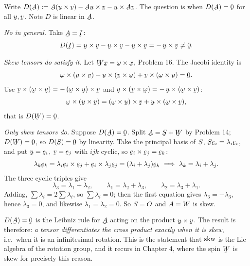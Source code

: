 \begin{problem}[Is $\bA(\bu\times\bv)=\bA\bu\times\bv+\bu\times\bA\bv$?]
\end{problem}
\begin{solution}
Write $D(\bA):=\bA(\bu\times\bv)-\bA\bu\times\bv-\bu\times\bA\bv$. The
question is when $D(\bA)=\bze$ for all $\bu,\bv$. Note $D$ is linear in
$\bA$.

\emph{No in general.} Take $\bA=\I$:
\[
   D(\I)=\bu\times\bv-\bu\times\bv-\bu\times\bv=-\,\bu\times\bv\neq\bze .
\]

\emph{Skew tensors do satisfy it.} Let $\bW\bx=\bom\times\bx$, Problem 16.
The Jacobi identity is
\[
   \bom\times(\bu\times\bv)+\bu\times(\bv\times\bom)
   +\bv\times(\bom\times\bu)=\bze .
\]
Use $\bv\times(\bom\times\bu)=-\,(\bom\times\bu)\times\bv$ and
$\bu\times(\bv\times\bom)=-\,\bu\times(\bom\times\bv)$:
\[
   \bom\times(\bu\times\bv)=(\bom\times\bu)\times\bv
   +\bu\times(\bom\times\bv),
\]
that is $D(\bW)=\bze$.

\emph{Only skew tensors do.} Suppose $D(\bA)=\bze$. Split
$\bA=\bS+\bW$ by Problem 14; $D(\bW)=\bze$, so $D(\bS)=\bze$ by
linearity. Take the principal basis of $\bS$, $\bS\be_{i}=\lambda_{i}
\be_{i}$, and put $\bu=\be_{i}$, $\bv=\be_{j}$ with $ijk$ cyclic, so
$\be_{i}\times\be_{j}=\be_{k}$:
\[
   \lambda_{k}\be_{k}
   =\lambda_{i}\be_{i}\times\be_{j}+\be_{i}\times\lambda_{j}\be_{j}
   =(\lambda_{i}+\lambda_{j})\be_{k}
   \ \Longrightarrow\
   \lambda_{k}=\lambda_{i}+\lambda_{j}.
\]
The three cyclic triples give
\[
   \lambda_{3}=\lambda_{1}+\lambda_{2},\qquad
   \lambda_{1}=\lambda_{2}+\lambda_{3},\qquad
   \lambda_{2}=\lambda_{3}+\lambda_{1}.
\]
Adding, $\sum\lambda_{i}=2\sum\lambda_{i}$, so $\sum\lambda_{i}=0$; then
the first equation gives $\lambda_{3}=-\lambda_{3}$, hence
$\lambda_{3}=0$, and likewise $\lambda_{1}=\lambda_{2}=0$. So $\bS=\Ob$
and $\bA=\bW$ is skew.
\end{solution}

\begin{remark}\label{rem:P7derivation}
$D(\bA)=\bze$ is the Leibniz rule for $\bA$ acting on the product
$\bu\times\bv$. The result is therefore: \emph{a tensor differentiates the
cross product exactly when it is skew}, i.e.\ when it is an infinitesimal
rotation. This is the statement that $\operatorname{skw}$ is the Lie algebra of the
rotation group, and it recurs in Chapter 4, where the spin $\bW$ is skew
for precisely this reason.
\end{remark}

